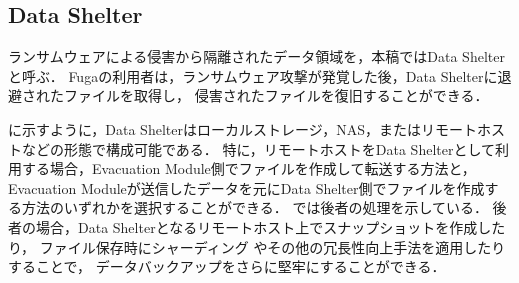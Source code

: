 \subsection{Data Shelter}
\label{subsec:data-shelter}
ランサムウェアによる侵害から隔離されたデータ領域を，本稿ではData Shelterと呼ぶ．
Fugaの利用者は，ランサムウェア攻撃が発覚した後，Data Shelterに退避されたファイルを取得し，
侵害されたファイルを復旧することができる．

に示すように，Data Shelterはローカルストレージ，NAS，またはリモートホストなどの形態で構成可能である．
特に，リモートホストをData Shelterとして利用する場合，Evacuation Module側でファイルを作成して転送する方法と，
Evacuation Moduleが送信したデータを元にData Shelter側でファイルを作成する方法のいずれかを選択することができる．
では後者の処理を示している．
後者の場合，Data Shelterとなるリモートホスト上でスナップショットを作成したり，
ファイル保存時にシャーディング \cite{what-is-sharding}やその他の冗長性向上手法を適用したりすることで，
データバックアップをさらに堅牢にすることができる．
